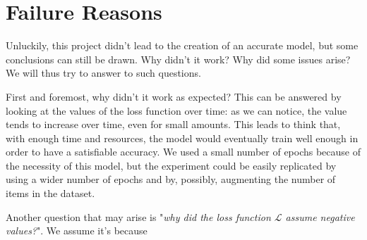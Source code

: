 \documentclass[11pt,journal]{IEEEtran}
\newcommand{\nl}{

\medskip

}
\begin{document}
\section{Failure Reasons}

Unluckily, this project didn't lead to the creation of an accurate model, but some conclusions can still be drawn. Why didn't it work? Why did some issues arise? We will thus try to answer to such questions.

\nl
First and foremost, why didn't it work as expected? This can be answered by looking at the values of the loss function over time: as we can notice, the value tends to increase over time, even for small amounts. This leads to think that, with enough time and resources, the model would eventually train well enough in order to have a satisfiable accuracy. We used a small number of epochs because of the necessity of this model, but the experiment could be easily replicated by using a wider number of epochs and by, possibly, augmenting the number of items in the dataset.
\nl
Another question that may arise is "\textit{why did the loss function $\mathcal{L}$ assume negative values?}". We assume it's because



\end{document}
